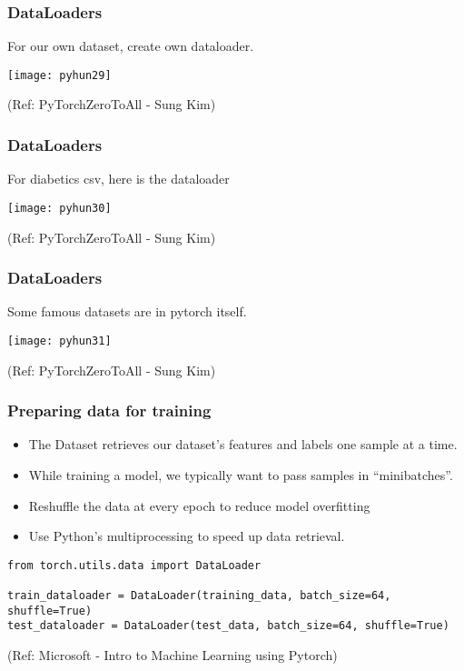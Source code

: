 \begin{frame}[fragile] \frametitle{DataLoaders}
For our own dataset, create own dataloader.
\begin{center}
\texttt{[image: pyhun29]}
\end{center}

\tiny{(Ref: PyTorchZeroToAll  - Sung Kim)}
\end{frame}

\begin{frame}[fragile] \frametitle{DataLoaders}
For diabetics csv, here is the dataloader
\begin{center}
\texttt{[image: pyhun30]}
\end{center}

\tiny{(Ref: PyTorchZeroToAll  - Sung Kim)}
\end{frame}


\begin{frame}[fragile] \frametitle{DataLoaders}
Some famous datasets are in pytorch itself.
\begin{center}
\texttt{[image: pyhun31]}
\end{center}

\tiny{(Ref: PyTorchZeroToAll  - Sung Kim)}
\end{frame}


\begin{frame}[fragile] \frametitle{Preparing data for training}

\begin{itemize}
\item The Dataset retrieves our dataset's features and labels one sample at a time.
\item While training a model, we typically want to pass samples in ``minibatches''.
\item Reshuffle the data at every epoch to reduce model overfitting
\item Use Python's multiprocessing to speed up data retrieval.
\end{itemize}

\begin{lstlisting}
from torch.utils.data import DataLoader

train_dataloader = DataLoader(training_data, batch_size=64, shuffle=True)
test_dataloader = DataLoader(test_data, batch_size=64, shuffle=True)
\end{lstlisting}

\tiny{(Ref: Microsoft - Intro to Machine Learning using Pytorch)}
\end{frame}

